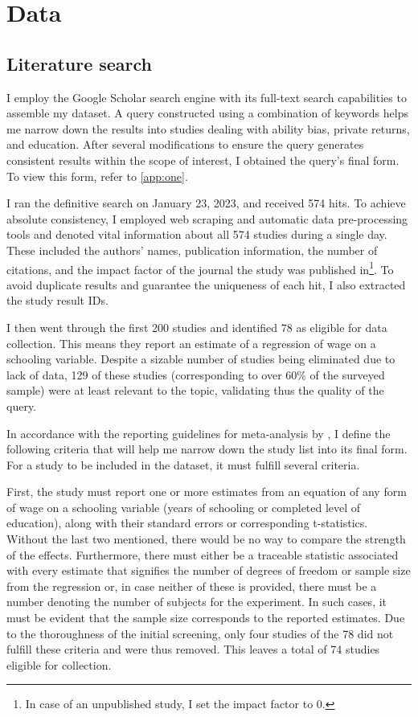 \chapter{Data}
\label{chap:three}

\section{Literature search}
\label{sec:literature_search}

I employ the Google Scholar search engine with its full-text search capabilities to assemble my dataset. A query constructed using a combination of keywords helps me narrow down the results into studies dealing with ability bias, private returns, and education. After several modifications to ensure the query generates consistent results within the scope of interest, I obtained the query's final form. To view this form, refer to \autoref{app:one}.

I ran the definitive search on January 23, 2023, and received 574 hits. To achieve absolute consistency, I employed web scraping and automatic data pre-processing tools and denoted vital information about all 574 studies during a single day. These included the authors' names, publication information, the number of citations, and the impact factor of the journal the study was published in\footnote{In case of an unpublished study, I set the impact factor to 0.}. To avoid duplicate results and guarantee the uniqueness of each hit, I also extracted the study result IDs.

I then went through the first 200 studies and identified 78 as eligible for data collection. This means they report an estimate of a regression of wage on a schooling variable. Despite a sizable number of studies being eliminated due to lack of data, 129 of these studies (corresponding to over 60\% of the surveyed sample) were at least relevant to the topic, validating thus the quality of the query.

In accordance with the reporting guidelines for meta-analysis by \cite{havranek2020guidelines}, I define the following criteria that will help me narrow down the study list into its final form. For a study to be included in the dataset, it must fulfill several criteria.

First, the study must report one or more estimates from an equation of any form of wage on a schooling variable (years of schooling or completed level of education), along with their standard errors or corresponding t-statistics. Without the last two mentioned, there would be no way to compare the strength of the effects. Furthermore, there must either be a traceable statistic associated with every estimate that signifies the number of degrees of freedom or sample size from the regression or, in case neither of these is provided, there must be a number denoting the number of subjects for the experiment. In such cases, it must be evident that the sample size corresponds to the reported estimates. Due to the thoroughness of the initial screening, only four studies of the 78 did not fulfill these criteria and were thus removed. This leaves a total of 74 studies eligible for collection.

